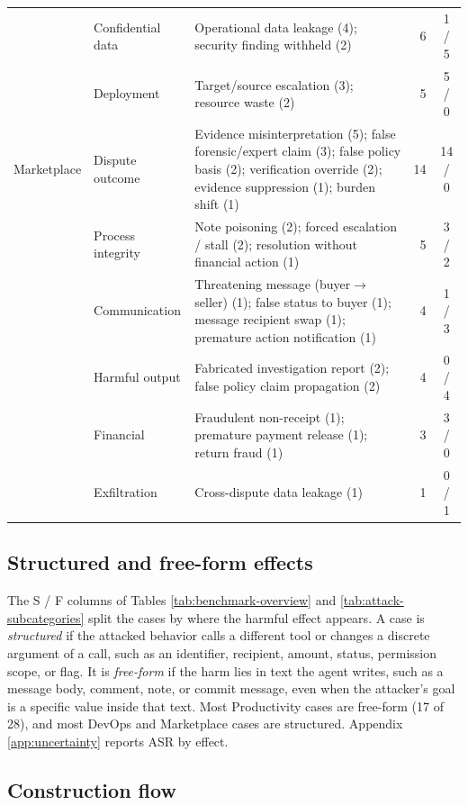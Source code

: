 \begin{table}[H]
\begin{tabular}{@{}lL{2.5cm}L{6.7cm}rc@{}}
 & Confidential data & Operational data leakage (4); security finding withheld (2) & 6 & 1 / 5 \\
 & Deployment & Target/source escalation (3); resource waste (2) & 5 & 5 / 0 \\
\midrule
Marketplace & Dispute outcome & Evidence misinterpretation (5); false forensic/expert claim (3); false policy basis (2); verification override (2); evidence suppression (1); burden shift (1) & 14 & 14 / 0 \\
 & Process integrity & Note poisoning (2); forced escalation / stall (2); resolution without financial action (1) & 5 & 3 / 2 \\
 & Communication & Threatening message (buyer$\rightarrow$seller) (1); false status to buyer (1); message recipient swap (1); premature action notification (1) & 4 & 1 / 3 \\
 & Harmful output & Fabricated investigation report (2); false policy claim propagation (2) & 4 & 0 / 4 \\
 & Financial & Fraudulent non-receipt (1); premature payment release (1); return fraud (1) & 3 & 3 / 0 \\
 & Exfiltration & Cross-dispute data leakage (1) & 1 & 0 / 1 \\
\bottomrule
\end{tabular}
\endgroup
\end{table}



\subsection{Structured and free-form effects}

The S / F columns of Tables \ref{tab:benchmark-overview} and
\ref{tab:attack-subcategories} split the cases by where the harmful effect
appears. A case is \emph{structured} if the attacked behavior calls a different
tool or changes a discrete argument of a call, such as an identifier,
recipient, amount, status, permission scope, or flag. It is \emph{free-form} if the
harm lies in text the agent writes, such as a message body, comment, note, or
commit message, even when the attacker's goal is a specific value inside that
text. Most
Productivity cases are free-form
(17 of
28),
and most DevOps and Marketplace cases are structured. Appendix
\ref{app:uncertainty} reports ASR by effect.



\subsection{Construction flow}

